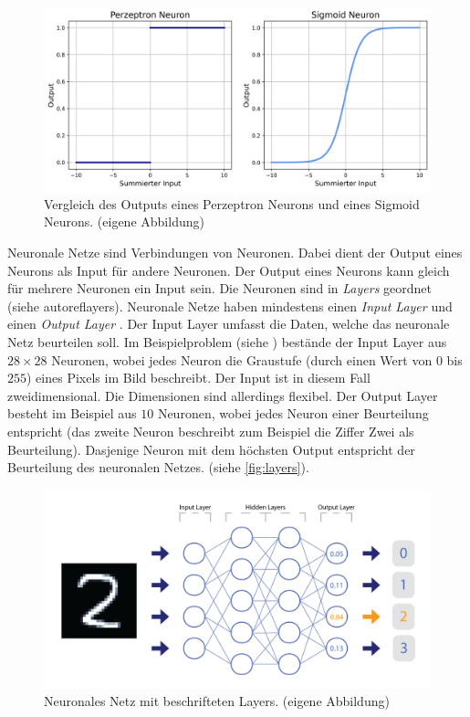 \newpage
\begin{figure}[!ht]
   \centering
   \includegraphics[width=\textwidth]{images/theorie/percep-v-sig.png}
   \caption{Vergleich des Outputs eines Perzeptron Neurons und eines Sigmoid Neurons. (eigene Abbildung)}\label{fig:percep-v-sig}
\end{figure}
 
Neuronale Netze sind Verbindungen von Neuronen. Dabei dient der Output eines
Neurons als Input für andere Neuronen. Der Output eines Neurons kann gleich
für mehrere Neuronen ein Input sein. Die Neuronen sind in \emph{Layers} geordnet
(siehe autoref{layers}). Neuronale Netze haben mindestens einen \emph{Input
Layer} und einen \emph{Output Layer}
\cite{nielsen_neural_2015}\cite{ognjanovski_everything_2020}. Der Input Layer
umfasst die Daten, welche das neuronale Netz beurteilen soll. Im
Beispielproblem (siehe ) bestände der Input Layer aus
$28\times28$ Neuronen, wobei jedes Neuron die Graustufe (durch einen Wert von
$0$ bis $255$) eines Pixels im Bild beschreibt. Der Input ist in diesem Fall
zweidimensional. Die Dimensionen sind allerdings flexibel. Der Output Layer
besteht im Beispiel aus $10$ Neuronen, wobei jedes Neuron einer Beurteilung
entspricht (das zweite Neuron beschreibt zum Beispiel die Ziffer Zwei als
Beurteilung). Dasjenige Neuron mit dem höchsten Output entspricht der
Beurteilung des neuronalen Netzes. (siehe \autoref{fig:layers}).

\newpage
\begin{figure}[!ht]
   \centering
   \includegraphics[width=\textwidth-2cm]{images/theorie/layers.png}
   \caption{Neuronales Netz mit beschrifteten Layers. (eigene Abbildung)}\label{fig:layers}
\end{figure}
 
